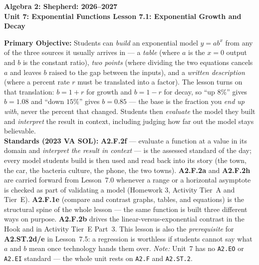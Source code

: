 \documentclass[10pt]{article}
\newcommand{\CourseName}{Algebra 2: Shepherd}
\newcommand{\SchoolYear}{2026--2027}
\newcommand{\UnitNumberName}{Unit 7: Exponential Functions \quad}
\newcommand{\LessonNumberName}{Lesson 7.1: Exponential Growth and Decay}
\begin{document}
\begin{center}
    {\Large\bfseries \CourseName: \SchoolYear \\
    {\small\bfseries \UnitNumberName \LessonNumberName}}
\end{center}

\begin{tcolorbox}[colback=forestbg, colframe=forest, boxrule=0.9pt, arc=2mm,
    left=2mm, right=2mm, top=1.5mm, bottom=1.5mm]
    \textbf{Primary Objective:} Students can \emph{build} an exponential model $y=ab^{x}$ from any of
    the three sources it usually arrives in --- a \emph{table} (where $a$ is the $x=0$ output and $b$
    is the constant ratio), \emph{two points} (where dividing the two equations cancels $a$ and
    leaves $b$ raised to the gap between the inputs), and a \emph{written description} (where a
    percent rate $r$ must be translated into a factor). The lesson turns on that translation:
    $b=1+r$ for growth and $b=1-r$ for decay, so ``up $8\%$'' gives $b=1.08$ and ``down $15\%$''
    gives $b=0.85$ --- the base is the fraction you \emph{end up with}, never the percent that
    changed. Students then \emph{evaluate} the model they built and \emph{interpret} the result in
    context, including judging how far out the model stays believable.
    \\[2pt]
    \textbf{Standards (2023 VA SOL):} \textbf{A2.F.2f} --- evaluate a function at a value in its
    domain and \emph{interpret the result in context} --- is the assessed standard of the day; every
    model students build is then used and read back into its story (the town, the car, the bacteria
    culture, the phone, the two towns). \textbf{A2.F.2a} and \textbf{A2.F.2h} are carried forward
    from Lesson~7.0 whenever a range or a horizontal asymptote is checked as part of validating a
    model (Homework 3, Activity Tier~A and Tier~E). \textbf{A2.F.1e} (compare and contrast graphs,
    tables, and equations) is the structural spine of the whole lesson --- the same function is
    built three different ways on purpose. \textbf{A2.F.2b} drives the linear-versus-exponential
    contrast in the Hook and in Activity Tier~E Part~3. This lesson is also the \emph{prerequisite}
    for \textbf{A2.ST.2d/e} in Lesson~7.5: a regression is worthless if students cannot say what $a$
    and $b$ mean once technology hands them over. \emph{Note:} Unit~7 has no \texttt{A2.EO} or
    \texttt{A2.EI} standard --- the whole unit rests on \texttt{A2.F} and \texttt{A2.ST.2}.
\end{tcolorbox}
\end{document}
